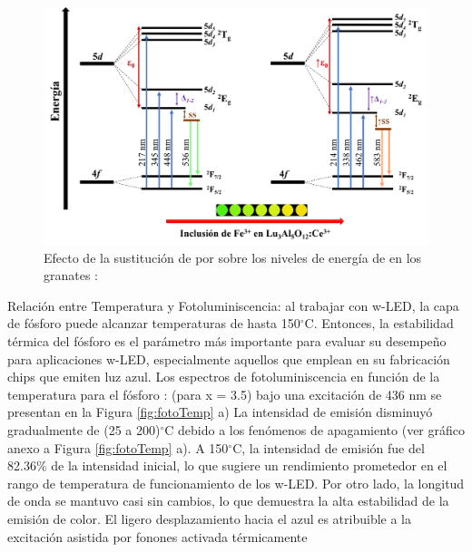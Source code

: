 \begin{figure}[h]
    \centering%

    \includegraphics[width=\textwidth]{Kap4/NivelesEnergia.png}%
    \caption{Efecto de la sustitución de  por  sobre
    los niveles de energía de  en los granates
    :}\label{fig:niveles}
\end{figure}

Relación entre Temperatura y Fotoluminiscencia: al trabajar con w-LED, la capa
de fósforo puede alcanzar temperaturas de hasta 150$^{\circ}$C. Entonces, la
estabilidad térmica del fósforo es el parámetro más importante para evaluar su
desempeño para aplicaciones w-LED, especialmente aquellos que emplean en su
fabricación chips que emiten luz azul. Los espectros de fotoluminiscencia en
función de la temperatura para el fósforo
: (para x = 3.5)
bajo una excitación de 436 nm se presentan en la Figura \ref{fig:fotoTemp} a)
La intensidad de
emisión disminuyó gradualmente de (25 a 200)$^{\circ}$C debido a los fenómenos de
apagamiento (ver gráfico anexo a Figura \ref{fig:fotoTemp} a). A 150$^{\circ}$C, la
intensidad de
emisión fue del 82.36\% de la intensidad inicial, lo que sugiere un rendimiento
prometedor en el rango de temperatura de funcionamiento de los w-LED. Por otro
lado, la longitud de onda se mantuvo casi sin cambios, lo que demuestra la alta
estabilidad de la emisión de color. El ligero desplazamiento hacia el azul es
atribuible a la excitación asistida por fonones activada térmicamente
\cite{Xia2011}\\

